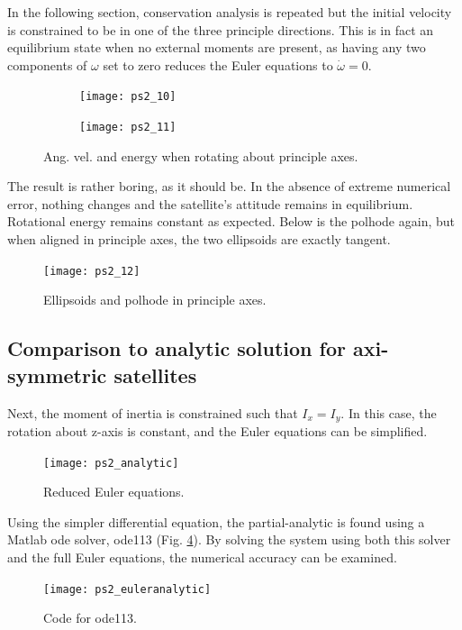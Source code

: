 \documentclass[12pt, letterpaper]{article}
\begin{document}
In the following section, conservation analysis is repeated but the initial velocity is constrained to be in one of the three principle directions. This is in fact an equilibrium state when no external moments are present, as having any two components of $\omega$ set to zero reduces the Euler equations to $\dot{\omega}=0$.

\begin{figure}[H]
	\centering
	\begin{subfigure}[b]{0.49\textwidth}
		\texttt{[image: ps2\_10]}
	\end{subfigure}
	\begin{subfigure}[b]{0.49\textwidth}
		\texttt{[image: ps2\_11]}
	\end{subfigure}
	\caption{Ang. vel. and energy when rotating about principle axes.}
	\label{(2:angVel2)}
\end{figure}

The result is rather boring, as it should be. In the absence of extreme numerical error, nothing changes and the satellite's attitude remains in equilibrium. Rotational energy remains constant as expected. Below is the polhode again, but when aligned in principle axes, the two ellipsoids are exactly tangent.

\begin{figure}[H]
	\centering
	\texttt{[image: ps2\_12]}
	\caption{Ellipsoids and polhode in principle axes.}
	\label{2:polhode2}
\end{figure}

\subsection{Comparison to analytic solution for axi-symmetric satellites}

Next, the moment of inertia is constrained such that $I_x=I_y$. In this case, the rotation about z-axis is constant, and the Euler equations can be simplified.

\begin{figure}[H]
	\centering
	\texttt{[image: ps2\_analytic]}
	\caption{Reduced Euler equations.}
	\label{2:reducedEuler}
\end{figure}

Using the simpler differential equation, the partial-analytic is found using a Matlab ode solver, ode113 (Fig. \ref{2:codeEuler}). By solving the system using both this solver and the full Euler equations, the numerical accuracy can be examined.

\begin{figure}[H]
	\centering
	\texttt{[image: ps2\_euleranalytic]}
	\caption{Code for ode113.}
	\label{2:codeEuler}
\end{figure}
\end{document}
